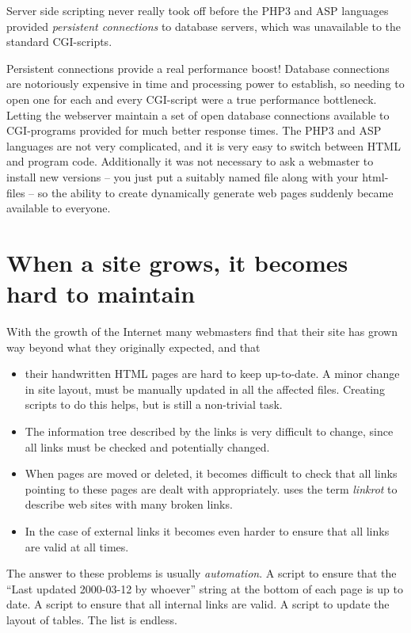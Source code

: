 Server side scripting never really took off before the PHP3 and ASP
languages provided \textit{persistent connections} to database
servers, which was unavailable to the standard CGI-scripts.  

Persistent connections provide a real performance boost!  Database
connections are notoriously expensive in time and processing power to
establish, so needing to open one for each and every CGI-script were a
true performance bottleneck.  Letting the webserver maintain a set of
open database connections available to CGI-programs provided for much
better response times.  The PHP3 and ASP languages are not very
complicated, and it is very easy to switch between HTML and program
code.  Additionally it was not necessary to ask a webmaster to install
new versions -- you just put a suitably named file along with your
html-files -- so the ability to create dynamically generate web pages
suddenly became available to everyone.


\section{When a site grows, it becomes hard to maintain}
\label{sec:when-a-site-grows-it-becomes-hard-to-maintain}

With the growth of the Internet many webmasters find that their site
has grown way beyond what they originally expected, and that

\begin{itemize}
\item their handwritten HTML pages are hard to keep up-to-date.  A
  minor change in site layout, must be manually updated in all the
  affected files.  Creating scripts to do this helps, but is still a
  non-trivial task.
\item The information tree described by the links is very difficult to
  change, since all links must be checked and potentially changed.
\item When pages are moved or deleted, it becomes difficult to check
  that all links pointing to these pages are dealt with appropriately.
  uses the term \textit{linkrot} to describe web sites with many
  broken links.
\item In the case of external links it becomes even harder to ensure
  that all links are valid at all times.
\end{itemize}

The answer to these problems is usually \textit{automation}.  A script
to ensure that the  ``Last updated 2000-03-12 by whoever'' string at
the bottom of each page is up to date.   A script to ensure that all
internal links are valid.  A script to update the layout of tables.
The list is endless.

